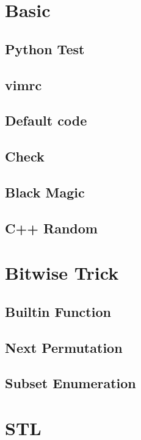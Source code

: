 \section{Basic}
\subsection{Python Test}

\subsection{vimrc}

\subsection{Default code}

\subsection{Check}

\subsection{Black Magic}

\subsection{C++ Random}


\section{Bitwise Trick}
\subsection{Builtin Function}

\subsection{Next Permutation}

\subsection{Subset Enumeration}


\section{STL}
